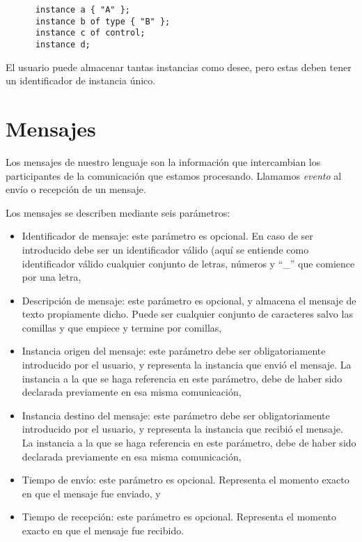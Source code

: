 \begin{lstlisting}
      instance a { "A" };
      instance b of type { "B" };
      instance c of control;
      instance d;
\end{lstlisting}

El usuario puede almacenar tantas instancias como desee, pero estas
deben tener un identificador de instancia único.

\section{Mensajes}\label{sec:Mensajes}

Los mensajes de nuestro lenguaje son la información que intercambian
los participantes de la comunicación que estamos procesando. Llamamos
\textit{evento} al envío o recepción de un mensaje.

Los mensajes se describen mediante seis parámetros:

\begin{itemize}
\item Identificador de mensaje: este parámetro es opcional. En caso de
  ser introducido debe ser un identificador válido (aquí se entiende
  como identificador válido cualquier conjunto de letras, números y
  ``\_'' que comience por una letra,
\item Descripción de mensaje: este parámetro es opcional, y almacena el mensaje de
  texto propiamente dicho. Puede ser cualquier conjunto de caracteres
  salvo las comillas y que empiece y termine por comillas,
\item Instancia origen del mensaje: este parámetro debe ser
  obligatoriamente introducido por el usuario, y representa la
  instancia que envió el mensaje. La instancia a la que se haga
  referencia en este parámetro, debe de haber sido declarada
  previamente en esa misma comunicación,
\item Instancia destino del mensaje: este parámetro debe ser
  obligatoriamente introducido por el usuario, y representa la
  instancia que recibió el mensaje. La instancia a la que se haga
  referencia en este parámetro, debe de haber sido declarada
  previamente en esa misma comunicación,
\item Tiempo de envío: este parámetro es opcional. Representa el
  momento exacto en que el mensaje fue enviado, y
\item Tiempo de recepción: este parámetro es opcional. Representa el
  momento exacto en que el mensaje fue recibido.
\end{itemize}

